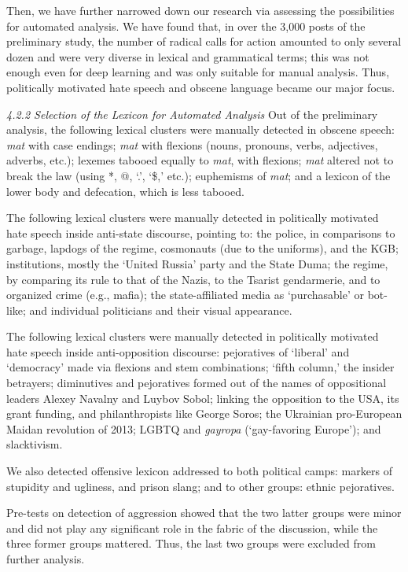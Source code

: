 Then, we have further narrowed down our research via assessing the possibilities for automated analysis. We have found that, in over the 3,000 posts of the preliminary study, the number of radical calls for action amounted to only several dozen and were very diverse in lexical and grammatical terms; this was not enough even for deep learning and was only suitable for manual analysis. Thus, politically motivated hate speech and obscene language became our major focus.

\textit{4.2.2 Selection of the Lexicon for Automated Analysis}
Out of the preliminary analysis, the following lexical clusters were manually detected in obscene speech: \textit{mat} with case endings; \textit{mat} with flexions (nouns, pronouns, verbs, adjectives, adverbs, etc.); lexemes tabooed equally to \textit{mat}, with flexions; \textit{mat} altered not to break the law (using *, @, ‘.’, ‘\$,’ etc.); euphemisms of \textit{mat}; and a lexicon of the lower body and defecation, which is less tabooed.

The following lexical clusters were manually detected in politically motivated hate speech inside anti-state discourse, pointing to: the police, in comparisons to garbage, lapdogs of the regime, cosmonauts (due to the uniforms), and the KGB; institutions, mostly the ‘United Russia’ party and the State Duma; the regime, by comparing its rule to that of the Nazis, to the Tsarist gendarmerie, and to organized crime (e.g., mafia); the state-affiliated media as ‘purchasable’ or bot-like; and individual politicians and their visual appearance.

The following lexical clusters were manually detected in politically motivated hate speech inside anti-opposition discourse: pejoratives of ‘liberal’ and ‘democracy’ made via flexions and stem combinations; ‘fifth column,’ the insider betrayers; diminutives and pejoratives formed out of the names of oppositional leaders Alexey Navalny and Luybov Sobol; linking the opposition to the USA, its grant funding, and philanthropists like George Soros; the Ukrainian pro-European Maidan revolution of 2013; LGBTQ and \textit{gayropa} (‘gay-favoring Europe’); and slacktivism.

We also detected offensive lexicon addressed to both political camps: markers of stupidity and ugliness, and prison slang; and to other groups: ethnic pejoratives.

Pre-tests on detection of aggression showed that the two latter groups were minor and did not play any significant role in the fabric of the discussion, while the three former groups mattered. Thus, the last two groups were excluded from further analysis.

